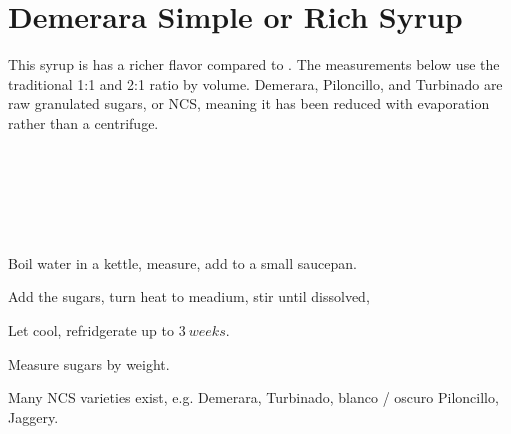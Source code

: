 \section[Demerara Syrup]{Demerara Simple or Rich Syrup}


\begin{recipestats}[
	servings=$1~C$,
	preptime=5~\minute,
	source=Mike \& Jane,
	original=\citefield{cocktailSeminars2021}{title}~\cite{cocktailSeminars2021},
]
\end{recipestats}

\begin{recipeabstract}
	This syrup is has a richer flavor compared to .
	The measurements below use the traditional 1:1 and 2:1 ratio by volume.
	Demerara, Piloncillo, and Turbinado are raw granulated sugars, or \gls{NCS},
		meaning it has been reduced with evaporation rather than a centrifuge\cite{worldSugarGuide}.
\end{recipeabstract}

\begin{ingredientcolumns}
	\begin{ingredientblock}[simple]
		\\
        \\
	\end{ingredientblock}

	\begin{ingredientblock}[rich]
		\\
        \\
	\end{ingredientblock}
\end{ingredientcolumns}


\begin{preparation}
\item Boil water in a kettle, measure, add to a small saucepan.
\item Add the sugars, turn heat to meadium, stir until dissolved,
\item Let cool, refridgerate up to $3~weeks$.
\end{preparation}

\begin{experiments}
\item Measure sugars by weight.
\end{experiments}

\begin{variation}
\item Many \gls{NCS} varieties exist, e.g. Demerara, Turbinado, blanco / oscuro Piloncillo, Jaggery.
\end{variation}


\recipeend%
